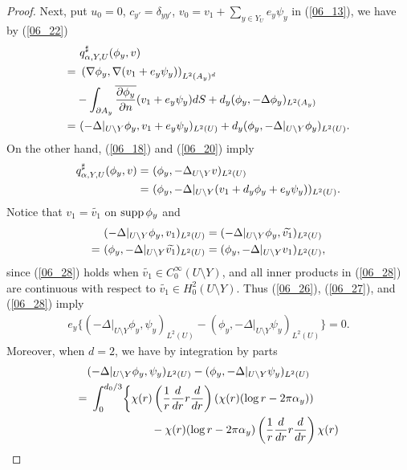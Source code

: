 \documentclass[12pt,a4paper]{article}
\def\supp{\mathop{\rm supp}\nolimits}
\begin{document}
\begin{proof}
Next, put $u_0=0$, $c_{y'}=\delta_{y y'}$, 
$v_0=v_1+\sum_{y\in Y_U}e_y \psi_y$ in (\ref{06_13}),
we have by (\ref{06_22})
\begin{align}
&\ q^\sharp_{\alpha,Y,U}(\phi_y,v)\notag\\
=&\ \left(\nabla \phi_y,\nabla(v_1+e_y \psi_y)\right)_{L^2(A_y)^d}\notag\\
&-\int_{\partial A_y}\overline{\frac{\partial \phi_y}{\partial n}}
(v_1+e_y \psi_y)dS
+
d_y(\phi_y,-\Delta \phi_y)_{L^2(A_y)}\notag\\
=&\ 
(-\Delta|_{U\setminus Y}\phi_y, v_1+e_y\psi_y)_{L^2(U)}
+
d_y(\phi_y,-\Delta|_{U\setminus Y}\phi_y)_{L^2(U)}.
\label{06_26}
\end{align}
On the other hand, (\ref{06_18}) and (\ref{06_20}) imply
\begin{align}
 q^\sharp_{\alpha,Y,U}(\phi_y,v)
=&\ 
(\phi_y,-\Delta_{U\setminus Y}v)_{L^2(U)}\notag\\
=&\ 
(\phi_y,-\Delta|_{U\setminus Y}(v_1+d_y\phi_y+e_y\psi_y))_{L^2(U)}.
\label{06_27}
\end{align}
Notice that $v_1=\widetilde{v_1}$ on $\supp \phi_y$ and
\begin{align}
&\  (-\Delta|_{U\setminus Y}\phi_y,v_1)_{L^2(U)}
=
 (-\Delta|_{U\setminus Y}\phi_y,\widetilde{v_1})_{L^2(U)}
\notag\\
=&\ 
 (\phi_y,-\Delta|_{U\setminus Y}\widetilde{v_1})_{L^2(U)}
=
 (\phi_y,-\Delta|_{U\setminus Y} v_1)_{L^2(U)},
\label{06_28}
\end{align}
since (\ref{06_28}) holds 
when $\widetilde{v_1}\in C_0^\infty(U\setminus Y)$,
and all inner products  in (\ref{06_28}) are continuous
with respect to $\widetilde{v_1}\in H^2_0(U\setminus Y)$.
Thus (\ref{06_26}), (\ref{06_27}), and (\ref{06_28}) imply
\begin{align}
 e_y
\bigl\{
(-\Delta|_{U\setminus Y} \phi_y,\psi_y)_{L^2(U)}
-
 (\phi_y,-\Delta|_{U\setminus Y} \psi_y)_{L^2(U)}
\bigr\}=0.
\label{06_29}
\end{align}
 Moreover,
when $d=2$, we have by integration by parts
\begin{align}
& (-\Delta|_{U\setminus Y}\phi_y,\psi_y)_{L^2(U)}
-
 (\phi_y,-\Delta|_{U\setminus Y}\psi_y)_{L^2(U)}
\notag\\
=&\ 
\int_0^{d_0/3}
\biggl\{
\chi(r)\left(\frac{1}{r}\frac{d}{dr}r \frac{d}{dr}\right)
(\chi(r)(\log r-2\pi\alpha_y))
\notag\\
&\hspace{2cm}
-
\chi(r)(\log r-2\pi\alpha_y)\left(\frac{1}{r}\frac{d}{dr}r \frac{d}{dr}\right)\chi(r)

\end{align}
\end{proof}
\end{document}
